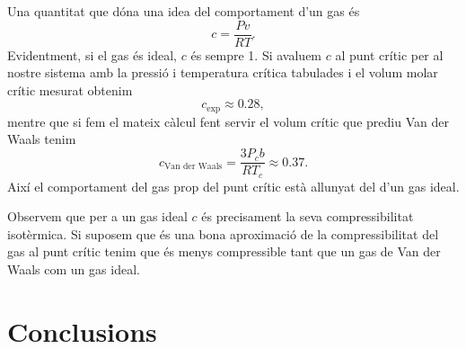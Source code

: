 \documentclass[12pt]{article}
\numberwithin{table}{section}
\numberwithin{figure}{section}
\numberwithin{equation}{section}
\begin{document}
Una quantitat que dóna una idea del comportament d'un gas és 
\begin{equation*}
	c = \frac{Pv}{RT}.
\end{equation*}
Evidentment, si el gas és ideal, \( c \) és sempre 1. Si avaluem \( c \) al punt crític per al nostre sistema amb la pressió i temperatura crítica tabulades i el volum molar crític mesurat obtenim
\begin{equation*}
	c_\text{exp} \approx 0.28,
\end{equation*}
mentre que si fem el mateix càlcul fent servir el volum crític que prediu Van der Waals tenim
\begin{equation*}
c_\text{Van der Waals} = \frac{3P_cb}{RT_c} \approx 0.37. 
\end{equation*}
Així el comportament del gas prop del punt crític està allunyat del d'un gas ideal. 

Observem que per a un gas ideal \( c \) és precisament la seva compressibilitat isotèrmica. Si suposem que és una bona aproximació de la compressibilitat del gas al punt crític tenim que és menys compressible tant que un gas de Van der Waals com un gas ideal.  

\section{Conclusions}


\pagebreak



\pagebreak
\appendix
\end{document}
